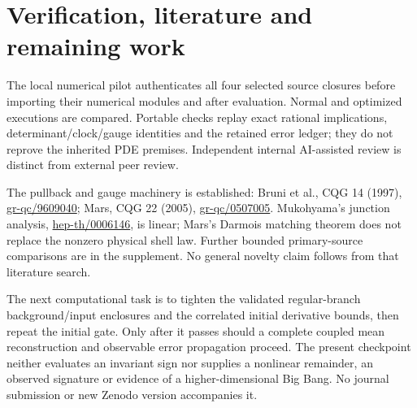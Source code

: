 \documentclass[11pt]{article}
\begin{document}
\section*{Verification, literature and remaining work}
The local numerical pilot authenticates all four selected source closures
before importing their numerical modules and after evaluation. Normal and
optimized executions are compared. Portable checks replay exact rational
implications, determinant/clock/gauge identities and the retained error
ledger; they do not reprove the inherited PDE premises. Independent
internal AI-assisted review is distinct from external peer review.

The pullback and gauge machinery is established: Bruni et al., CQG 14
(1997), \href{https://arxiv.org/abs/gr-qc/9609040}{gr-qc/9609040};
Mars, CQG 22 (2005), \href{https://arxiv.org/abs/gr-qc/0507005}{gr-qc/0507005}.
Mukohyama's junction analysis,
\href{https://arxiv.org/abs/hep-th/0006146}{hep-th/0006146}, is linear;
Mars's Darmois matching theorem does not replace the nonzero physical
shell law. Further bounded primary-source comparisons are in the supplement.
No general novelty claim follows from that literature search.

The next computational task is to tighten the validated regular-branch
background/input enclosures and the correlated initial derivative bounds,
then repeat the initial gate. Only after it passes should a complete coupled
mean reconstruction and observable error propagation proceed. The present
checkpoint neither evaluates an invariant sign nor supplies a nonlinear
remainder, an observed signature or evidence of a higher-dimensional Big Bang.
No journal submission or new Zenodo version accompanies it.
\end{document}
